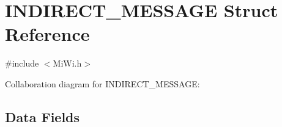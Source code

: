 \hypertarget{struct_i_n_d_i_r_e_c_t___m_e_s_s_a_g_e}{}\section{I\+N\+D\+I\+R\+E\+C\+T\+\_\+\+M\+E\+S\+S\+A\+G\+E Struct Reference}
\label{struct_i_n_d_i_r_e_c_t___m_e_s_s_a_g_e}


{\ttfamily \#include $<$Mi\+Wi.\+h$>$}



Collaboration diagram for I\+N\+D\+I\+R\+E\+C\+T\+\_\+\+M\+E\+S\+S\+A\+G\+E\+:
\subsection*{Data Fields}
